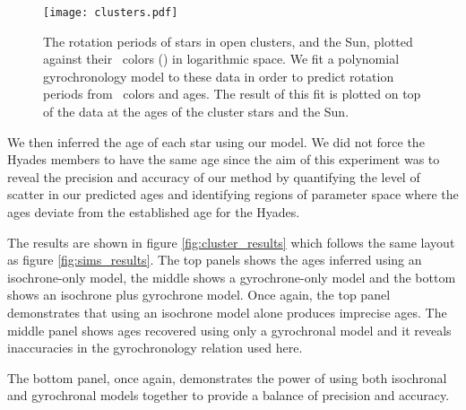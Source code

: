 \begin{figure}
  \caption{
The rotation periods of stars in open clusters, and the Sun, plotted against
    their \Gaia\ colors (\gcolor) in logarithmic space.
We fit a polynomial gyrochronology model to these data in order to predict
    rotation periods from \gaia\ colors and ages.
The result of this fit is plotted on top of the data at the ages of
    the cluster stars and the Sun.
}
  \centering
    \texttt{[image: clusters.pdf]}
\label{fig:clusters}
\end{figure}

We then inferred the age of each star using our model.
We did not force the Hyades members to have the same age since the aim of this
experiment was to reveal the precision and accuracy of our method by
quantifying the level of scatter in our predicted ages and identifying regions
of parameter space where the ages deviate from the established age for the
Hyades.

The results are shown in figure \ref{fig:cluster_results} which follows the
same layout as figure \ref{fig:sims_results}.
The top panels shows the ages inferred using an isochrone-only model, the
middle shows a gyrochrone-only model and the bottom shows an isochrone plus
gyrochrone model.
Once again, the top panel demonstrates that using an isochrone model alone
produces imprecise ages.
The middle panel shows ages recovered using only a gyrochronal model and it
reveals inaccuracies in the gyrochronology relation used here.

The bottom panel, once again, demonstrates the power of using both isochronal
and gyrochronal models together to provide a balance of precision and
accuracy.

